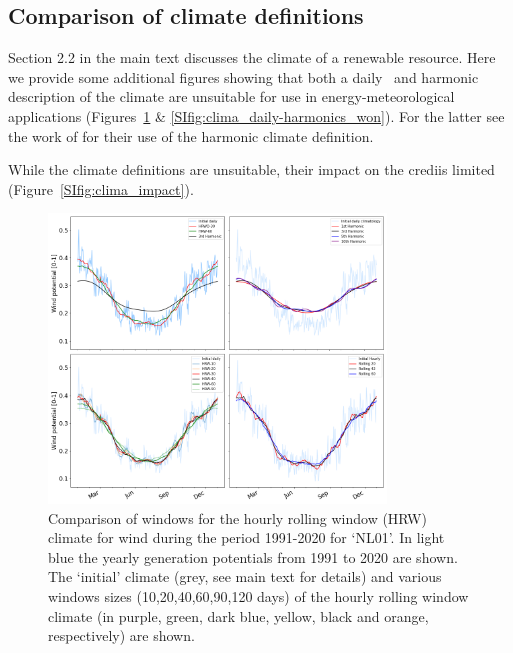 \documentclass[a4paper,11pt]{extarticle}
\newcommand{\credi}[0]{{\sc credi}}
\begin{document}
\subsection{Comparison of climate definitions}\label{app:Harmonics}
Section 2.2 in the main text discusses the climate of a renewable resource. 
Here we provide some additional figures showing that both a daily~\parencite{wmo2017normals} and harmonic description of the climate are unsuitable for use in energy-meteorological applications (Figures~\ref{SIfig:clima_daily-harmonics_spv} \& \ref{SIfig:clima_daily-harmonics_won}). 
For the latter see the work of \textcite{Sabziparvar2014,Fischer2019,Rayson2021} for their use of the harmonic climate definition. 

While the climate definitions are unsuitable, their impact on the \credi is limited (Figure~\ref{SIfig:clima_impact}). 

\begin{figure}[b]
    \centering
    \includegraphics[width=0.8\textwidth]{Fig_ClimatologyComparison_WON}
    \caption{
    Comparison of windows for the hourly rolling window (HRW) climate for wind during the period 1991-2020 for `NL01'. 
    In light blue the yearly generation potentials from 1991 to 2020 are shown. 
    The `initial' climate (grey, see main text for details) and various windows sizes (10,20,40,60,90,120 days) of the hourly rolling window climate (in purple, green, dark blue, yellow, black and orange, respectively) are shown.}
    \label{SIfig:clima_daily-harmonics_spv}
\end{figure}
\end{document}

